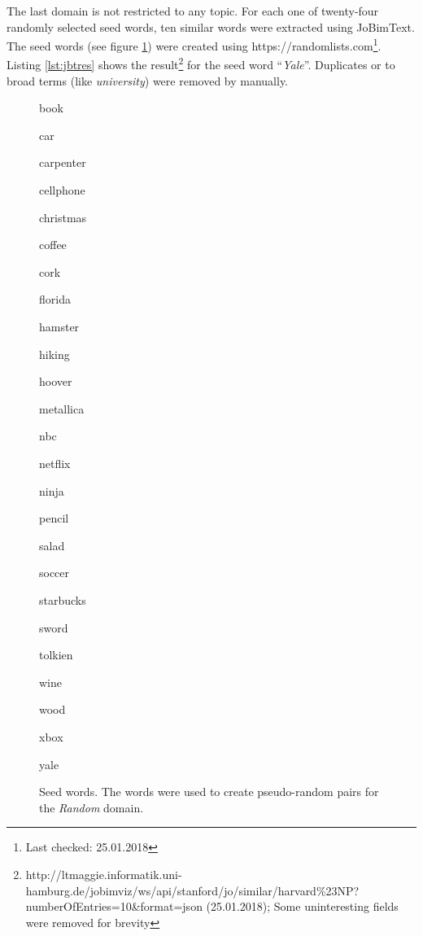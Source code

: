 The last domain is not restricted to any topic. For each one of twenty-four randomly selected seed words, ten similar words were extracted using JoBimText. The seed words (see figure \ref{fig:seed}) were created using https://randomlists.com\footnote{Last checked: 25.01.2018}. Listing \ref{lst:jbtres} shows the result\footnote{http://ltmaggie.informatik.uni-hamburg.de/jobimviz/ws/api/stanford/jo/similar/harvard\%23NP?numberOfEntries=10&format=json (25.01.2018); Some uninteresting fields were removed for brevity} for the seed word \enquote{\emph{Yale}}. Duplicates or to broad terms (like \emph{university}) were removed by manually.

\begin{figure}[h]
\centering
\caption{Seed words. The words were used to create pseudo-random pairs for the \emph{Random} domain. }
\label{fig:seed}
\begin{multicols}{5}
book%

car%

carpenter%

cellphone%

christmas%

coffee%

cork%

florida%

hamster%

hiking

hoover%

metallica%

nbc%

netflix%

ninja%

pencil%

salad%

soccer%

starbucks%

sword%

tolkien%

wine%

wood%

xbox%

yale%
\end{multicols}

\end{figure}

